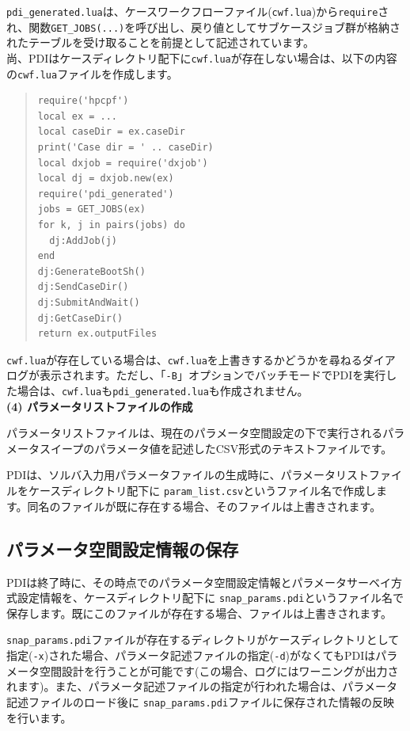 \documentclass[a4paper,11pt]{jarticle}
\begin{document}
{{\tt pdi\_generated.lua}は、ケースワークフローファイル({\tt cwf.lua})から{\tt require}され、関数{\tt GET\_JOBS(...)}を呼び出し、戻り値としてサブケースジョブ群が格納されたテーブルを受け取ることを前提として記述されています。\\

尚、PDIはケースディレクトリ配下に{\tt cwf.lua}が存在しない場合は、以下の内容の{\tt cwf.lua}ファイルを作成します。

\begin{quote}
\begin{verbatim}
require('hpcpf')
local ex = ...
local caseDir = ex.caseDir
print('Case dir = ' .. caseDir)
local dxjob = require('dxjob')
local dj = dxjob.new(ex)
require('pdi_generated')
jobs = GET_JOBS(ex)
for k, j in pairs(jobs) do
  dj:AddJob(j)
end
dj:GenerateBootSh()
dj:SendCaseDir()
dj:SubmitAndWait()
dj:GetCaseDir()
return ex.outputFiles
\end{verbatim}
\end{quote}

{\tt cwf.lua}が存在している場合は、{\tt cwf.lua}を上書きするかどうかを尋ねるダイアログが表示されます。ただし、「{\tt -B}」オプションでバッチモードでPDIを実行した場合は、{\tt cwf.lua}も{\tt pdi\_generated.lua}も作成されません。\\


\textbf{(4) パラメータリストファイルの作成}

パラメータリストファイルは、現在のパラメータ空間設定の下で実行されるパラメータスイープのパラメータ値を記述したCSV形式のテキストファイルです。

PDIは、ソルバ入力用パラメータファイルの生成時に、パラメータリストファイルをケースディレクトリ配下に {\tt param\_list.csv}というファイル名で作成します。同名のファイルが既に存在する場合、そのファイルは上書きされます。\\


\subsection{パラメータ空間設定情報の保存}

PDIは終了時に、その時点でのパラメータ空間設定情報とパラメータサーベイ方式設定情報を、ケースディレクトリ配下に {\tt snap\_params.pdi}というファイル名で保存します。既にこのファイルが存在する場合、ファイルは上書きされます。

{\tt snap\_params.pdi}ファイルが存在するディレクトリがケースディレクトリとして指定({\tt -x})された場合、パラメータ記述ファイルの指定({\tt -d})がなくてもPDIはパラメータ空間設計を行うことが可能です(この場合、ログにはワーニングが出力されます)。また、パラメータ記述ファイルの指定が行われた場合は、パラメータ記述ファイルのロード後に {\tt snap\_params.pdi}ファイルに保存された情報の反映を行います。

}
\end{document}
